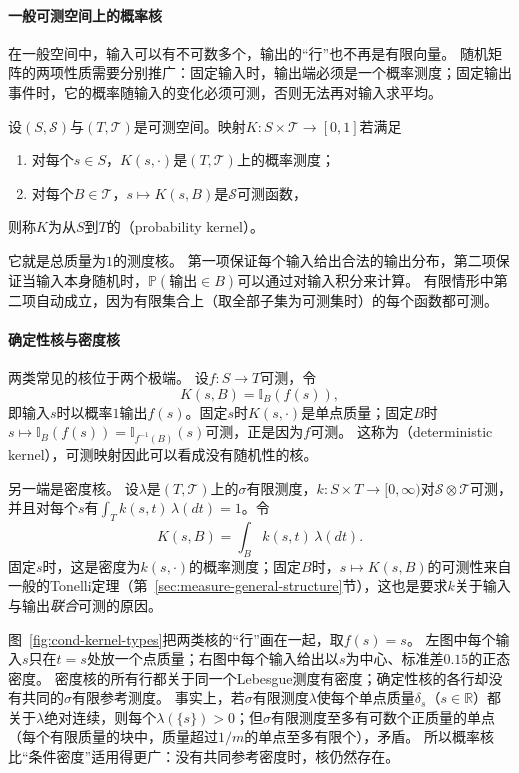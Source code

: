 \paragraph{一般可测空间上的概率核}
在一般空间中，输入可以有不可数多个，输出的“行”也不再是有限向量。
随机矩阵的两项性质需要分别推广：固定输入时，输出端必须是一个概率测度；固定输出事件时，它的概率随输入的变化必须可测，否则无法再对输入求平均。

\begin{definition}[概率核]
\label{def:cond-kernel}
设$(S,\mathcal S)$与$(T,\mathcal T)$是可测空间。映射$K:S\times\mathcal T\to[0,1]$若满足
\begin{enumerate}
  \item 对每个$s\in S$，$K(s,\cdot)$是$(T,\mathcal T)$上的概率测度；
  \item 对每个$B\in\mathcal T$，$s\mapsto K(s,B)$是$\mathcal S$可测函数，
\end{enumerate}
则称$K$为从$S$到$T$的（probability kernel）。
\end{definition}

它就是总质量为$1$的测度核。
第一项保证每个输入给出合法的输出分布，第二项保证当输入本身随机时，$\mathbb P(\text{输出}\in B)$可以通过对输入积分来计算。
有限情形中第二项自动成立，因为有限集合上（取全部子集为可测集时）的每个函数都可测。

\paragraph{确定性核与密度核}
两类常见的核位于两个极端。
设$f:S\to T$可测，令
\[
  K(s,B)=\mathbb I_B(f(s)),
\]
即输入$s$时以概率$1$输出$f(s)$。固定$s$时$K(s,\cdot)$是单点质量；固定$B$时$s\mapsto\mathbb I_B(f(s))=\mathbb I_{f^{-1}(B)}(s)$可测，正是因为$f$可测。
这称为（deterministic kernel），可测映射因此可以看成没有随机性的核。

另一端是密度核。
设$\lambda$是$(T,\mathcal T)$上的$\sigma$有限测度，$k:S\times T\to[0,\infty)$对$\mathcal S\otimes\mathcal T$可测，并且对每个$s$有$\int_Tk(s,t)\,\lambda(dt)=1$。令
\[
  K(s,B)=\int_Bk(s,t)\,\lambda(dt).
\]
固定$s$时，这是密度为$k(s,\cdot)$的概率测度；固定$B$时，$s\mapsto K(s,B)$的可测性来自一般的Tonelli定理（第~\ref{sec:measure-general-structure}节），这也是要求$k$关于输入与输出\emph{联合}可测的原因。

图~\ref{fig:cond-kernel-types}把两类核的“行”画在一起，取$f(s)=s$。
左图中每个输入$s$只在$t=s$处放一个点质量；右图中每个输入给出以$s$为中心、标准差$0.15$的正态密度。
密度核的所有行都关于同一个Lebesgue测度有密度；确定性核的各行却没有共同的$\sigma$有限参考测度。
事实上，若$\sigma$有限测度$\lambda$使每个单点质量$\delta_s$（$s\in\mathbb R$）都关于$\lambda$绝对连续，则每个$\lambda(\{s\})>0$；但$\sigma$有限测度至多有可数个正质量的单点（每个有限质量的块中，质量超过$1/m$的单点至多有限个），矛盾。
所以概率核比“条件密度”适用得更广：没有共同参考密度时，核仍然存在。

